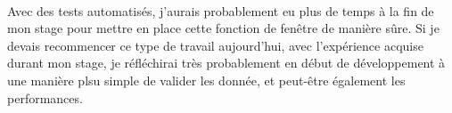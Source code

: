 \documentclass{article}
\begin{document}
    \paragraph{}
    Avec des tests automatisés, j'aurais probablement eu plus de temps à la fin de mon stage pour mettre en place cette fonction de fenêtre de manière sûre. Si je devais recommencer ce type de travail aujourd'hui, avec l'expérience acquise durant mon stage, je réfléchirai très probablement en début de développement à une manière plsu simple de valider les donnée, et peut-être également les performances.

    


\end{document}
